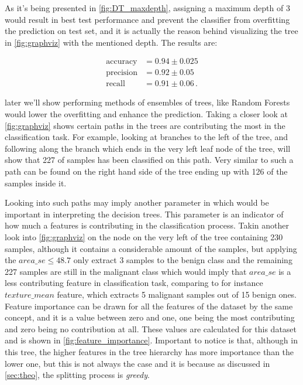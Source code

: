 \documentclass[12pt, a4paper]{scrartcl}
\begin{document}
As it's being presented in \cref{fig:DT_maxdepth}, assigning a maximum depth of 3 would result in best test performance and prevent the classifier from overfitting the prediction on test set, and it is actually the reason behind visualizing the tree in \cref{fig:graphviz} with the mentioned depth. The results are:

\begin{align*}
	\text{accuracy} &= 0.94 \pm 0.025 \\
	\text{precision} &= 0.92 \pm 0.05 \\
	\text{recall} &= 0.91 \pm 0.06 \, .
\end{align*}

later we'll show performing methods of ensembles of trees, like Random Forests would lower the overfitting and enhance the prediction.
Taking a closer look at \cref{fig:graphviz} shows certain paths in the trees are contributing the most in the classification task. For example, looking at branches to the left of the tree, and following along the branch which ends in the very left leaf node of the tree, will show that 227 of samples has been classified on this path. Very similar to such a path can be found on the right hand side of the tree ending up with 126 of the samples inside it. 

Looking into such paths may imply another parameter in which would be important in interpreting the decision trees. This parameter is an indicator of how much a features is contributing in the classification process.  Takin another look into \cref{fig:graphviz} on the node on the very left of the tree containing 230 samples, although it contains a considerable amount of the samples, but applying the $area\_se \leq 48.7$ only extract 3 samples to the benign class and the remaining 227 samples are still in the malignant class which would imply that \emph{$area\_se$} is a less contributing feature in classification task, comparing to for instance \emph{$texture\_mean$} feature, which extracts 5 malignant samples out of 15 benign ones. Feature importance can be drawn for all the features of the dataset by the same concept, and it is a value between zero and one, one being the most contributing and zero being no contribution at all. These values are calculated for this dataset and is shown in \cref{fig:feature_importance}. Important to notice is that, although in this tree, the higher features in the tree hierarchy has more importance than the lower one, but this is not always the case and it is because as discussed in \cref{sec:theo}, the splitting process is \emph{greedy}.
\end{document}

